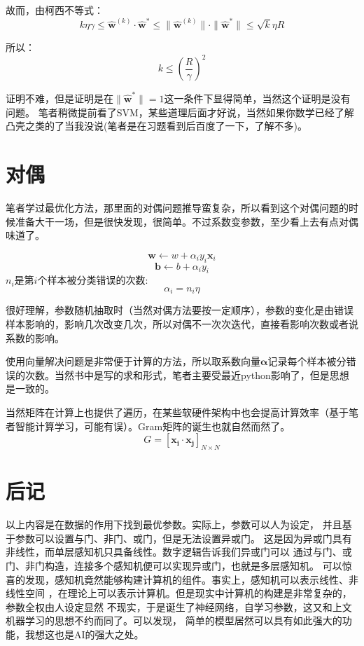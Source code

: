 \documentclass{article}
\begin{document}
故而，由柯西不等式：
\[k\eta\gamma \le \widehat{\boldsymbol{w}}^{(k)}\cdot \widehat{\boldsymbol{w}}^* \le \|\widehat{\boldsymbol{w}}^{(k)}\|\cdot\|\widehat{\boldsymbol{w}}^*\|\le \sqrt{k}\eta R
\]

所以：
\[k \le (\frac{R}{\gamma})^2\]

证明不难，但是证明是在$\|\boldsymbol{\widehat{w}^*}\|=1$这一条件下显得简单，当然这个证明是没有问题。
笔者稍微提前看了SVM，某些道理后面才好说，当然如果你数学已经了解凸壳之类的了当我没说(笔者是在习题看到后百度了一下，了解不多)。

\section{对偶}
笔者学过最优化方法，那里面的对偶问题推导蛮复杂，所以看到这个对偶问题的时候准备大干一场，但是很快发现，很简单。不过系数变参数，至少看上去有点对偶味道了。

\[\boldsymbol{w}\leftarrow w+\alpha_i y_i \boldsymbol{x}_i\]
\[\boldsymbol{b}\leftarrow b+\alpha_i y_i\]
$n_i$是第$i$个样本被分类错误的次数:
\[\alpha_i=n_i \eta\]

很好理解，参数随机抽取时（当然对偶方法要按一定顺序），参数的变化是由错误样本影响的，影响几次改变几次，所以对偶不一次次迭代，直接看影响次数或者说系数的影响。

使用向量解决问题是非常便于计算的方法，所以取系数向量$\boldsymbol{\alpha}$记录每个样本被分错误的次数。当然书中是写的求和形式，笔者主要受最近python影响了，但是思想是一致的。

当然矩阵在计算上也提供了遍历，在某些软硬件架构中也会提高计算效率（基于笔者智能计算学习，可能有误）。Gram矩阵的诞生也就自然而然了。
\[G=[\boldsymbol{x_i}\cdot\boldsymbol{x_j}]_{N\times N}\]

\section*{后记}
以上内容是在数据的作用下找到最优参数。实际上，参数可以人为设定，
并且基于参数可以设置与门、非门、或门，但是无法设置异或门。
这是因为异或门具有非线性，而单层感知机只具备线性。数字逻辑告诉我们异或门可以
通过与门、或门、非门构造，连接多个感知机便可以实现异或门，也就是多层感知机。
可以惊喜的发现，感知机竟然能够构建计算机的组件。事实上，感知机可以表示线性、非线性空间
，在理论上可以表示计算机。但是现实中计算机的构建是非常复杂的，参数全权由人设定显然
不现实，于是诞生了神经网络，自学习参数，这又和上文机器学习的思想不约而同了。可以发现，
简单的模型居然可以具有如此强大的功能，我想这也是AI的强大之处。
\end{document}

